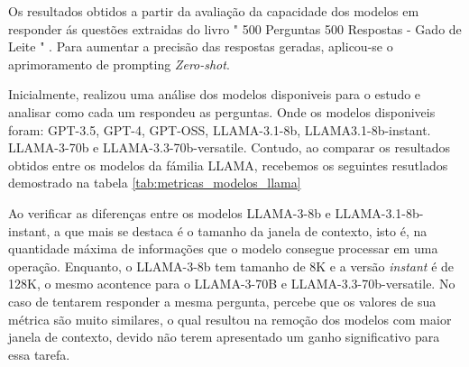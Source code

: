 


Os resultados obtidos a partir da avaliação da capacidade dos modelos em responder ás questões extraidas do livro " 500 Perguntas 500 Respostas - Gado de Leite " \cite{embrapa2012gadoleite}. Para aumentar a precisão das respostas geradas, aplicou-se o aprimoramento de prompting \textit{Zero-shot}.

Inicialmente, realizou uma análise dos modelos disponiveis para o estudo e analisar como cada um respondeu as perguntas. Onde os modelos disponiveis foram: GPT-3.5, GPT-4, GPT-OSS, LLAMA-3.1-8b,  LLAMA3.1-8b-instant. LLAMA-3-70b e LLAMA-3.3-70b-versatile. Contudo, ao comparar os resultados obtidos entre os modelos da fámilia LLAMA, recebemos os seguintes resutlados demostrado na tabela \ref{tab:metricas_modelos_llama}

\begin{table}[h]
\centering

\caption{Comparação de métricas entre modelos LLAMA}
\label{tab:metricas_modelos_llama}
\end{table}

Ao verificar as diferenças entre os modelos LLAMA-3-8b e LLAMA-3.1-8b-instant, a que mais se destaca é o tamanho da janela de contexto, isto é, na quantidade máxima de informações que o modelo consegue processar em uma operação. Enquanto, o LLAMA-3-8b tem tamanho de 8K e a versão \textit{instant} é de 128K, o mesmo acontence para o LLAMA-3-70B e LLAMA-3.3-70b-versatile. No caso de tentarem responder a mesma pergunta, percebe que os valores de sua métrica são muito similares, o qual resultou na remoção dos modelos com maior janela de contexto, devido não terem apresentado um ganho significativo para essa tarefa.

